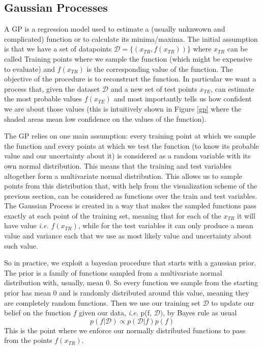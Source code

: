 \documentclass{article}
\begin{document}
\subsection{Gaussian Processes}
A GP is a regression model used to estimate a (usually unknwown and complicated) function or to calculate its minima/maxima. The initial assumption is that we have a set of datapoints $\mathcal{D} = \{(x_{TR}, f(x_{TR}))\}$ where $x_{TR}$ can be called Training points where we sample the function (which might be expensive to evaluate) and $f(x_{TR})$ is the corresponding value of the function. The objective of the procedure is to reconstruct the function. In particular we want a process that, given the dataset $\mathcal{D}$ and a new set of test points $x_{TE}$, can estimate the most probable values $f(x_{TE})$ and most importantly tells us how confident we are about those values (this is intuitively shown in Figure \ref{gp} where the shaded areas mean low confidence on the values of the function).

The GP relies on one main assumption: every training point at which we sample the function and every points at which we test the function (to know its probable value and our uncertainty about it) is considered as a random variable with its own normal distribution. This means that the training and test variables altogether form a multivariate normal distribution. This allows us to sample points from this distribution that, with help from the visualization scheme of the previous section, can be considered as functions over the train and test variables. The Gaussian Process is created in a way that makes the sampled functions pass exactly at each point of the training set, meaning that for each of the $x_{TR}$ it will have value \textit{i.e.} $f(x_{TR})$, while for the test variables it can only produce a mean value and variance each that we use as most likely value and uncertainty about such value. 

So in practice, we exploit a bayesian procedure that starts with a gaussian prior. The prior is a family of functions sampled from a multivariate normal distribution with, usually, mean 0. So every function we sample from the starting prior has mean 0 and is randomly distributed around this value, meaning they are completely random functions. Then we use our training set $\mathcal{D}$ to update our belief on the function $f$ given our data, \textit{i.e.} p(f, $\mathcal{D})$, by Bayes rule as usual
\begin{equation}
    p(f | \mathcal{D}) \propto p(\mathcal{D} | f) p(f)
\end{equation}
This is the point where we enforce our normally distributed functions to pass from the points $f(x_{TR})$.
\end{document}
